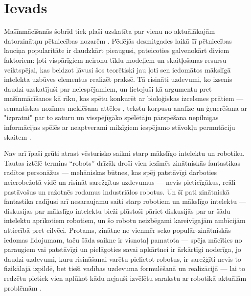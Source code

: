 \documentclass[12pt, a4paper]{article}
\numberwithin{equation}{section} %
\begin{document}

\newpage
\tableofcontents
\thispagestyle{empty}
\newpage
\setcounter{page}{3}


\section{Ievads}

Mašīnmācīšanās šobrīd tiek plaši uzskatīta par vienu no aktuālākajām datorzinātņu pētniecības nozarēm \cite{no_shit}. Pēdējās desmitgades laikā šī pētniecības lauciņa popularitāte ir daudzkārt pieaugusi, pateicoties galvenokārt diviem faktoriem: ļoti vispārīgiem neironu tīklu modeļiem un skaitļošanas resursu veiktspējai, kas beidzot ļāvusi šos teorētiski jau ļoti sen \cite{mcculloch1943logical, linnainmaa1970representation, fukushima1988neocognitron} iedomātos mākslīgā intelekta uzbūves elementus realizēt praksē. Tā risināti uzdevumi, ko izsenis daudzi uzskatījuši par neiespējamiem, un lietojuši kā argumentu pret mašīnmācīšanos kā rīku, kas spētu konkurēt ar bioloģiskas izcelsmes prātiem --- semantiskas nozīmes meklēšana attēlos \cite{krizhevsky2012imagenet}, tekstu korpusu analīze un ģenerēšana ar "izpratni" par to saturu \cite{vaswani2017attention} un visspējīgāko spēlētāju pārspēšana nepilnīgas informācijas spēlēs ar neaptverami milzīgiem iespējamo stāvokļu permutāciju skaitem \cite{silver2016mastering}.

Nav arī īpaši grūti atrast vēsturisko saikni starp mākslīgo intelektu un robotiku. Tautas iztēlē termins ``robots'' drīzāk droši vien iezīmēs zinātniskās fantastikas radītos personāžus --- mehāniskas būtnes, kas spēj patstāvīgi darboties neierobežotā vidē un risināt sarežģītus uzdevumus --- nevis pieticīgākus, reāli pastāvošus un ražotnēs rodamus industriālos robotus. Un šī pati zinātniskā fantastika radījusi arī nesaraujamu saiti starp robotiem un mākslīgo intelektu \cite{asimov2004robot} --- diskusijas par mākslīgo intelektu bieži plūstoši pāriet diskusijās par ar šādu intelektu aprīkotiem robotiem, un šo robotu neizbēgami kareivīgajām ambīcijām attiecībā pret cilvēci. Protams, zinātne ne vienmēr seko populār-zinātniskās iedomas lidojumam, taču šāda saikne ir visnotaļ pamatota --- spēja mācīties no paraugiem vai patstāvīgi un pielāgoties savai apkārtnei ir ārkārtīgi noderīga, jo daudzi uzdevumi, kuru risināšanai varētu pielietot robotus, ir sarežģīti nevis to fizikālajā izpildē, bet tieši vadības uzdevuma formulēšanā un realizācijā --- lai to redzētu pietiek vien aplūkot kādu nejauši izvēlētu sarakstu ar robotikā aktuālām problēmām \cite{popsci}.
\end{document}
